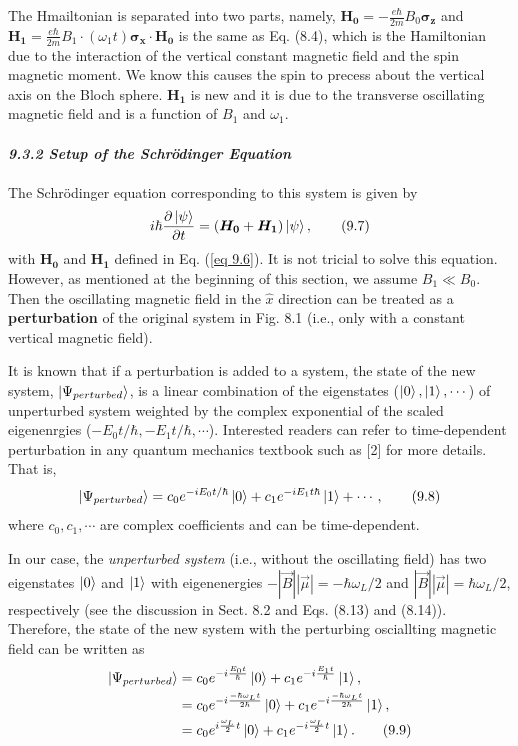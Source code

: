 \documentclass{article}
\newcommand{\bfit}[1]{\textit{\textbf{#1}}}
\begin{document}
The Hmailtonian is separated into two parts, namely, $\boldsymbol{H_0}=-\frac{e\hbar}{2m}B_0\boldsymbol{\sigma_z}$
and $\boldsymbol{H_1}=\frac{e\hbar}{2m}B_1\cdot(\omega_1t)\boldsymbol{\sigma_x}\cdot\boldsymbol{H_0}$ is the same
as Eq. (8.4), which is the Hamiltonian due to the interaction of the vertical constant magnetic
field and the spin magnetic moment. We know this causes the spin to precess about the vertical axis on the
Bloch sphere. $\boldsymbol{H_1}$ is new and it is due to the transverse oscillating magnetic field
and is a function of $B_1$ and $\omega_1$.\\\\
\bfit{\large 9.3.2 Setup of the Schr\"{o}dinger Equation}\\\\
The Schr\"{o}dinger equation corresponding to this system is given by
\begin{equation}\label{eq 9.7}
    i\hbar\frac{\partial\ket{\psi}}{\partial t}=(\boldsymbol{H_0}+\boldsymbol{H_1})\ket{\psi},\tag{9.7}\\
\end{equation}
with $\boldsymbol{H_0}$ and $\boldsymbol{H_1}$ defined in Eq. (\ref{eq 9.6}). It is not tricial to solve this equation.
However, as mentioned at the beginning of this section, we assume $B_1\ll B_0$.
Then the oscillating magnetic field in the $\hat{x}$ direction can be treated as a \textbf{perturbation}
of the original system in Fig. 8.1 (i.e., only with a constant vertical magnetic field).

It is known that if a perturbation is added to a system, the state of the new system,
$\ket{\Psi_{perturbed}}$, is a linear combination of the eigenstates ($\ket{0}, \ket{1},\cdots$) of
unperturbed system weighted by the complex exponential of the scaled eigenenrgies ($-E_0t/\hbar, -E_1t/\hbar,\cdots$).
Interested readers can refer to time-dependent perturbation in any quantum mechanics textbook such as
[2] for more details. That is,
\begin{equation}\label{eq 9.8}
    \ket{\Psi_{perturbed}}=c_0e^{-iE_0t/\hbar}\ket{0}+c_1e^{-iE_1t\hbar}\ket{1}+\cdots,\tag{9.8}
\end{equation}
where $c_0, c_1,\cdots$ are complex coefficients and can be time-dependent.

In our case, the \textit{unperturbed system} (i.e., without the oscillating field) has two
eigenstates $\ket{0}$ and $\ket{1}$ with eigenenergies $-|\vec{B}||\vec{\mu}|=-\hbar\omega_L/2$ and
$|\vec{B}||\vec{\mu}|=\hbar\omega_L/2$, respectively (see the discussion in Sect. 8.2 and
Eqs. (8.13) and (8.14)). Therefore, the state of the new system with the perturbing osciallting
magnetic field can be written as
\begin{align*}\label{eq 9.9}
    \ket{\Psi_{perturbed}}&=c_0e^{-i\frac{E_0t}{\hbar}}\ket{0}+
    c_1e^{-i\frac{E_1t}{\hbar}}\ket{1},\\
    &=c_0e^{-i\frac{-\hbar\omega_Lt}{2\hbar}}\ket{0}+c_1e^{-i\frac{-\hbar\omega_Lt}{2\hbar}}\ket{1},\\
    &=c_0e^{i\frac{\omega_L}{2}t}\ket{0}+c_1e^{-i\frac{\omega_L}{2}t}\ket{1}.\tag{9.9}\\
\end{align*}
\end{document}
